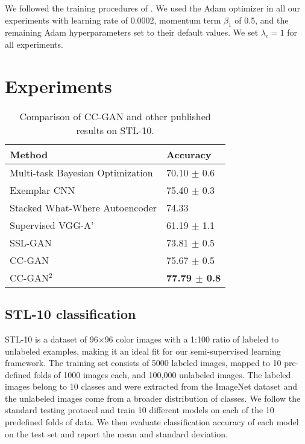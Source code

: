 \documentclass{article} \usepackage{iclr2017_conference,times}
\begin{document}
We followed the training procedures of \cite{radford2016}.
We used the Adam optimizer \citep{kingma2015} in all our experiments with learning rate of 0.0002, momentum term $\beta_1$ of 0.5, and the remaining Adam hyperparameters set to their default values.
We set $\lambda_c = 1$ for all experiments. 
 
\vspace{1em}
\section{Experiments}

\begin{table}[!t]
\centering
\small
\begin{tabularx}{0.7\textwidth}{l|l}
\bf{Method} & \bf{Accuracy}\\
\hline
\hline
Multi-task Bayesian Optimization \citep{swersky2013} & 70.10 $\pm$ 0.6 \\
Exemplar CNN \citep{dosovitskiy2014b} & 75.40 $\pm$ 0.3 \\
Stacked What-Where Autoencoder \citep{zhao2016}& 74.33 \\
\hline
Supervised VGG-A'  & 61.19 $\pm$ 1.1\\
SSL-GAN  & 73.81 $\pm$ 0.5\\
CC-GAN& 75.67 $\pm$ 0.5 \\
CC-GAN$^2$& \bf{77.79} $\pm$ 0.8 \\
\end{tabularx}
\vspace{2mm}
\caption{Comparison of CC-GAN and other published results on STL-10.}
\label{tab:stl}
\end{table}


\subsection{STL-10 classification}


STL-10 is a dataset of 96$\times$96 color images with a 1:100 ratio of labeled to unlabeled examples, making it an ideal fit for our semi-supervised learning framework. 
The training set consists of 5000 labeled images, mapped to 10 pre-defined folds of 1000 images each, and 100,000 unlabeled images.
The labeled images belong to 10 classes and were extracted from the ImageNet dataset and the unlabeled images come from a broader distribution of classes. 
We follow the standard testing protocol and train 10 different models on each of the 10 predefined folds of data. 
We then evaluate classification accuracy of each model on the test set and report the mean and standard deviation. 
\end{document}
